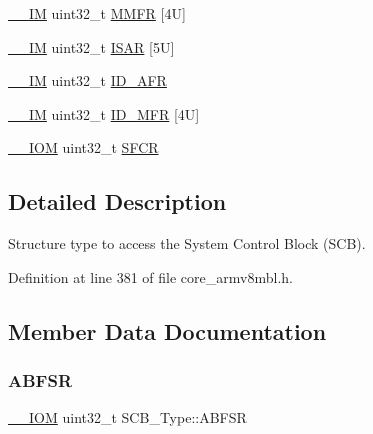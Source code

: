 \begin{DoxyCompactItemize}
\item 
\hyperlink{core__sc300_8h_a4cc1649793116d7c2d8afce7a4ffce43}{\+\_\+\+\_\+\+IM} uint32\+\_\+t \hyperlink{struct_s_c_b___type_a4f353f207bb27a1cea7861aa9eb00dbb}{M\+M\+FR} \mbox{[}4\+U\mbox{]}
\item 
\hyperlink{core__sc300_8h_a4cc1649793116d7c2d8afce7a4ffce43}{\+\_\+\+\_\+\+IM} uint32\+\_\+t \hyperlink{struct_s_c_b___type_a00e93446b3433a807f1574fa2f1fce54}{I\+S\+AR} \mbox{[}5\+U\mbox{]}
\item 
\hyperlink{core__sc300_8h_a4cc1649793116d7c2d8afce7a4ffce43}{\+\_\+\+\_\+\+IM} uint32\+\_\+t \hyperlink{struct_s_c_b___type_a9c9a1d805f8e99b9fd3ab4f455b6333a}{I\+D\+\_\+\+A\+FR}
\item 
\hyperlink{core__sc300_8h_a4cc1649793116d7c2d8afce7a4ffce43}{\+\_\+\+\_\+\+IM} uint32\+\_\+t \hyperlink{struct_s_c_b___type_a781ef24d88610a432e7d5b179d78de47}{I\+D\+\_\+\+M\+FR} \mbox{[}4\+U\mbox{]}
\item 
\hyperlink{core__sc300_8h_ab6caba5853a60a17e8e04499b52bf691}{\+\_\+\+\_\+\+I\+OM} uint32\+\_\+t \hyperlink{struct_s_c_b___type_a82273352d2e8c7a28a7b7cbdfc3d6a75}{S\+F\+CR}
\end{DoxyCompactItemize}


\subsection{Detailed Description}
Structure type to access the System Control Block (S\+CB). 

Definition at line 381 of file core\+\_\+armv8mbl.\+h.



\subsection{Member Data Documentation}
\mbox{\label{struct_s_c_b___type_a35a95c9a21f43a569a7ac212acb4cee7}} 
\subsubsection{\texorpdfstring{A\+B\+F\+SR}{ABFSR}}
{\footnotesize\ttfamily \hyperlink{core__sc300_8h_ab6caba5853a60a17e8e04499b52bf691}{\+\_\+\+\_\+\+I\+OM} uint32\+\_\+t S\+C\+B\+\_\+\+Type\+::\+A\+B\+F\+SR}

